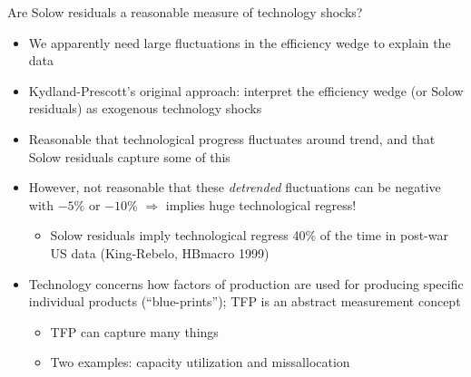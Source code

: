 \documentclass[9pt,xcolor={dvipsnames}]{beamer}
\newcommand{\bit}{\begin{itemize}}
\newcommand{\eit}{\end{itemize}}
\newcommand{\bc}{\color{blue}}
\begin{document}
\begin{frame}{Are Solow residuals a reasonable measure of technology shocks?}

\bit
\setlength\itemsep{1.5em} 

\item We apparently need large fluctuations in the efficiency wedge to explain the data

\item Kydland-Prescott's original approach: interpret the efficiency wedge (or Solow residuals) as {\bc exogenous technology shocks}

\item Reasonable that technological progress fluctuates around trend, and that Solow residuals capture some of this

\item However, not reasonable that these \emph{detrended} fluctuations can be negative with $-5 \%$ or $-10 \%$ $\Rightarrow$ implies huge technological regress!
\bit
	\item Solow residuals imply technological regress 40\% of the time in post-war US data (King-Rebelo, HBmacro 1999)
\eit

\item Technology concerns how factors of production are used for producing specific individual products (``blue-prints''); TFP is an abstract measurement concept
\bit
\setlength\itemsep{0.5em}
	\item TFP can capture many things
	
	\item Two examples: {\bc capacity utilization} and {\bc missallocation}
\eit

\eit

\end{frame}
\end{document}
